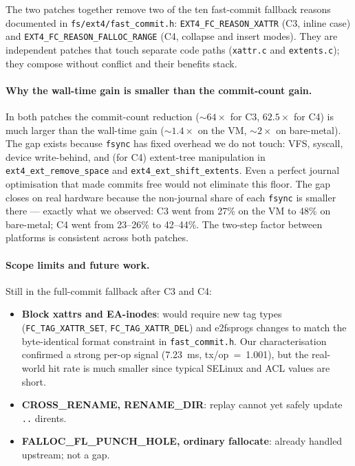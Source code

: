 \documentclass[12pt,a4paper]{article}
\begin{document}
The two patches together remove two of the ten fast-commit
fallback reasons documented in \texttt{fs/ext4/fast\_commit.h}:
\texttt{EXT4\_FC\_REASON\_XATTR} (C3, inline case) and
\texttt{EXT4\_FC\_REASON\_FALLOC\_RANGE} (C4, collapse and insert
modes).  They are independent patches that touch separate code
paths (\texttt{xattr.c} and \texttt{extents.c}); they compose
without conflict and their benefits stack.

\paragraph{Why the wall-time gain is smaller than the commit-count gain.}
In both patches the commit-count reduction (${\sim}64\times$ for
C3, $62.5\times$ for C4) is much larger than the wall-time gain
(${\sim}1.4\times$ on the VM, ${\sim}2\times$ on bare-metal).  The
gap exists because \texttt{fsync} has fixed overhead we do not
touch: VFS, syscall, device write-behind, and (for C4) extent-tree
manipulation in \texttt{ext4\_ext\_remove\_space} and
\texttt{ext4\_ext\_shift\_extents}.  Even a perfect journal
optimisation that made commits free would not eliminate this floor.
The gap closes on real hardware because the non-journal share of
each \texttt{fsync} is smaller there --- exactly what we observed:
C3 went from 27\% on the VM to 48\% on bare-metal; C4 went from
23--26\% to 42--44\%.  The two-step factor between platforms is
consistent across both patches.

\paragraph{Scope limits and future work.}
Still in the full-commit fallback after C3 and C4:
\begin{itemize}[leftmargin=*]
  \item \textbf{Block xattrs and EA-inodes}: would require new tag
        types (\texttt{FC\_TAG\_XATTR\_SET},
        \texttt{FC\_TAG\_XATTR\_DEL}) and e2fsprogs changes to
        match the byte-identical format constraint in
        \texttt{fast\_commit.h}.  Our characterisation confirmed a
        strong per-op signal (7.23~ms, tx/op~=~1.001), but the
        real-world hit rate is much smaller since typical SELinux
        and ACL values are short.
  \item \textbf{CROSS\_RENAME, RENAME\_DIR}: replay cannot yet
        safely update \texttt{..} dirents.
  \item \textbf{FALLOC\_FL\_PUNCH\_HOLE, ordinary fallocate}: already
        handled upstream; not a gap.
\end{itemize}
\end{document}
